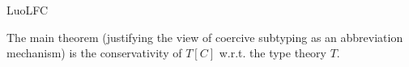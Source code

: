 \begin{entry}{LuoLFC}
\begin{history}
	 \end{history}
	
	\begin{technicalities}
	The main theorem
(justifying the view of coercive
subtyping as an abbreviation mechanism)
is the conservativity of $T[C]$ w.r.t. the
type theory $T$. %
	\end{technicalities}	
	
	
	
	
	
	
	
	
	\end{entry}

